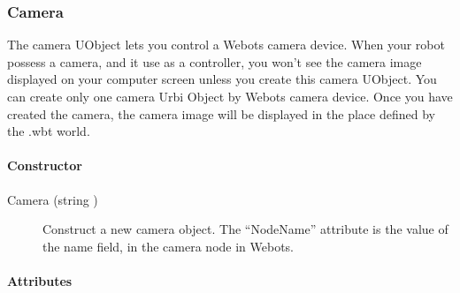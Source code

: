 \subsubsection{Camera}

The camera UObject lets you control a Webots camera device. When your
robot possess a camera, and it use \urbi as a controller, you won't
see the camera image displayed on your computer screen unless you
create this camera UObject. You can create only one camera Urbi Object
by Webots camera device. Once you have created the camera, the camera
image will be displayed in the place defined by the .wbt world.


\paragraph{Constructor}

\noindent
\begin{description}
\item[{Camera (string )}] Construct a new camera
  object. The ``NodeName'' attribute is the value of the name field,
  in the camera node in Webots.
\end{description}

\paragraph{Attributes}


